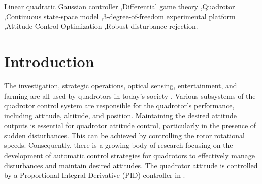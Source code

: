 \documentclass[3p,times]{elsarticle}
\begin{document}
\begin{frontmatter}
\begin{keyword}


Linear quadratic Gaussian controller \sep Differential game theory \sep Quadrotor \sep Continuous state-space model \sep 3-degree-of-freedom experimental platform \sep Attitude Control Optimization \sep Robust disturbance rejection.

\end{keyword}

\end{frontmatter}


\section{Introduction}\label{sec:intro}
The investigation, strategic operations, optical sensing, entertainment, and farming are all used by quadrotors in today's society \cite{drones5030059}.
Various subsystems of the quadrotor control system are responsible for the quadrotor's performance, including attitude, altitude, and position.
Maintaining the desired attitude outputs is essential for quadrotor attitude control, particularly in the presence of sudden disturbances. This can be achieved by controlling the rotor rotational speeds\cite{article_Sharifi}.
Consequently, there is a growing body of research focusing on the development of automatic control strategies for quadrotors to effectively manage disturbances and maintain desired attitudes.
The quadrotor attitude is controlled by a Proportional Integral Derivative (PID) controller in \cite{article_Bolandi,article_Abdul}.
\end{document}
